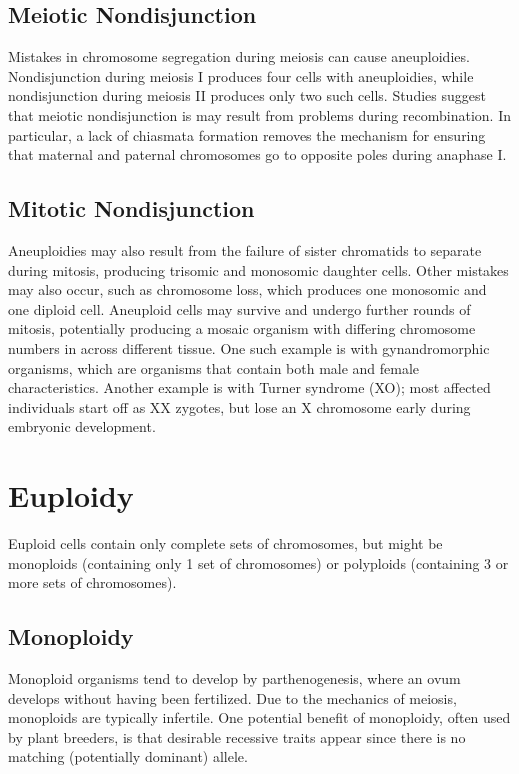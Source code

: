 \documentclass[12pt,titlepage]{article}
\begin{document}
      \subsection{Meiotic Nondisjunction}
        Mistakes in chromosome segregation during meiosis can cause aneuploidies. Nondisjunction during meiosis I produces four cells with
        aneuploidies, while nondisjunction during meiosis II produces only two such cells. Studies suggest that meiotic nondisjunction is may
        result from problems during recombination. In particular, a lack of chiasmata formation removes the mechanism for ensuring that
        maternal and paternal chromosomes go to opposite poles during anaphase I.

      \subsection{Mitotic Nondisjunction}
        Aneuploidies may also result from the failure of sister chromatids to separate during mitosis, producing trisomic and monosomic daughter
        cells. Other mistakes may also occur, such as chromosome loss, which produces one monosomic and one diploid cell. Aneuploid cells may
        survive and undergo further rounds of mitosis, potentially producing a mosaic organism with differing chromosome numbers in across
        different tissue. One such example is with gynandromorphic organisms, which are organisms that contain both male and female characteristics.
        Another example is with Turner syndrome (XO); most affected individuals start off as XX zygotes, but lose an X chromosome early during embryonic
        development.

    \section{Euploidy}
      Euploid cells contain only complete sets of chromosomes, but might be monoploids (containing only 1 set of chromosomes) or polyploids
      (containing 3 or more sets of chromosomes).

      \subsection{Monoploidy}
        Monoploid organisms tend to develop by parthenogenesis, where an ovum develops without having been fertilized. Due to the mechanics of meiosis,
        monoploids are typically infertile. One potential benefit of monoploidy, often used by plant breeders, is that desirable recessive traits appear
        since there is no matching (potentially dominant) allele.
\end{document}
